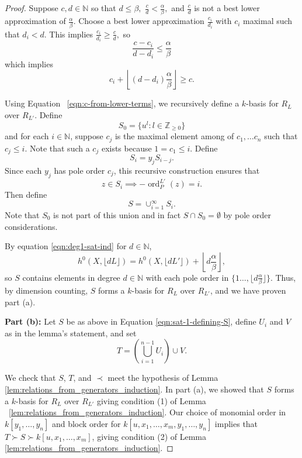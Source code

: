 \documentclass{amsart}
\theoremstyle{plain}
\theoremstyle{definition}
\theoremstyle{remark}
\numberwithin{equation}{section}
\DeclareMathOperator{\ord}{ord}
\newcommand{\halfcan}{L}
\begin{document}
\begin{proof}
Suppose $c,d\in \mathbb{N}$ so that $d\le \beta,$  $\frac{c}{d} < \frac{\alpha}{
\beta},$ and $\frac{c}{d}$ is not a best lower approximation of $\frac{\alpha}{\beta}$. Choose a
best lower approximation $\frac{c_i}{d_i}$ with $c_i$ maximal such that $d_i< d$.  This implies $\frac{c_i}{d_i}\ge \frac{c}{d},$ so 
\[
	\frac{c-c_i}{d-d_i}\le \frac{\alpha}{\beta}
\]
which implies
\begin{equation}\label{eqn:c-from-lower-terms}
	c_i +\left\lfloor (d-d_i) \frac{\alpha}{\beta} \right\rfloor \ge c.
\end{equation}

Using Equation ~\ref{eqn:c-from-lower-terms}, we recursively define a $k$-basis for $R_\halfcan$ over $R_{\halfcan'}$. Define 
\[
	S_0 = \{u^l : l\in \mathbb{Z}_{\ge 0}\}
\]
and for each $i \in \mathbb{N}$, suppose $c_j$ is the maximal element among of $c_1, \ldots c_n$ such that $c_j \le i.$ Note that such a $c_j$ exists because $1=c_1\le i.$ Define
\[
	S_i = y_j S_{i-j}.
\]
Since each $y_j$ has pole order $c_j$, this recursive construction ensures that 
\[
	z\in S_i \implies -\ord_P^{\halfcan'}(z)=i.
\]
Then define 
\begin{equation}\label{eqn:sat-1-defining-S}
	S = \cup_{i=1}^{\infty} S_i.  
\end{equation}
Note that $S_0$ is not part of this union and in fact $S\cap S_0 = \emptyset$ by pole order considerations.

By equation \ref{eqn:deg1-sat-ind} for $d\in \mathbb{N}$,
\[
	h^0(X, \lfloor{d\halfcan}\rfloor) = h^0(X,\lfloor d\halfcan'
		\rfloor) + \left\lfloor d\frac{\alpha} {\beta} \right \rfloor,
\] 
so $S$ contains elements in degree $d\in \mathbb{N}$ with each pole order in $\{1 \ldots, \lfloor d\frac{\alpha}{\beta}\rfloor\}$.  Thus, by dimension counting, $S$ forms a $k$-basis for $R_\halfcan$ over $R_{\halfcan'}$, and we have proven part (a).

{\bf Part (b):}
Let $S$ be as above in Equation \ref{eqn:sat-1-defining-S}, define $U_i$ and $V$ as in the lemma's statement, and set
\[
	T = \left(\bigcup_{i=1}^{n-1} U_i \right) \cup V.
\]

We check that $S$, $T$, and $\prec$ meet the hypothesis of Lemma \ref{lem:relations_from_generators_induction}.  In part (a), we showed that $S$ forms a $k$-basis for $R_\halfcan$ over $R_{\halfcan'}$ giving condition (1) of Lemma ~\ref{lem:relations_from_generators_induction}.  Our choice of monomial order in $k[y_1, \ldots, y_n]$ and block order for $k[u, x_1, \ldots, x_m, y_1, \ldots, y_n]$ implies that $T\succ S\succ k[u, x_1, \ldots, x_m]$, giving condition (2) of Lemma \ref{lem:relations_from_generators_induction}.  


\end{proof}
\end{document}
